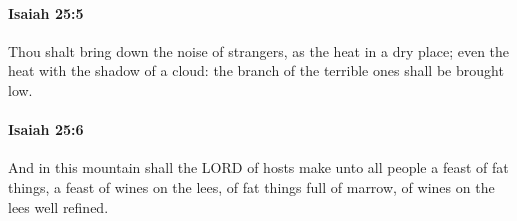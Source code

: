 		\paragraph{Isaiah 25:5} %
			\label{ISAIAH-25-5}

			Thou shalt bring down the noise of strangers, as the heat in a dry place; even the heat with the shadow of a cloud: the branch of the terrible ones shall be brought low.


		\paragraph{Isaiah 25:6} %
			\label{ISAIAH-25-6}

			And in this mountain shall the LORD of hosts make unto all people a feast of fat things, a feast of wines on the lees, of fat things full of marrow, of wines on the lees well refined.



